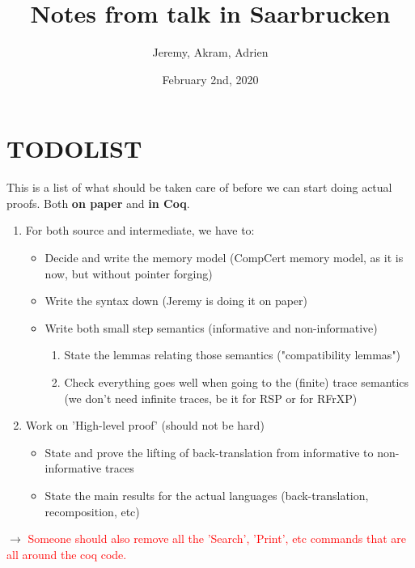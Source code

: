 \documentclass[12pt,a4paper]{article}
\title{Notes from talk in Saarbrucken}
\author{Jeremy, Akram, Adrien}
\date{February 2nd, 2020}
\newcommand{\todo}[1]{$\rightarrow$ \textcolor{red}{#1}}
\begin{document}
\maketitle
\tableofcontents


\section{TODOLIST}
This is a list of what should be taken care of before we can start doing actual proofs. 
Both \textbf{on paper} and \textbf{in Coq}.

\begin{enumerate}
\item For both source and intermediate, we have to:
\begin{itemize}
\item Decide and write the memory model (CompCert memory model, as it is now, but without pointer forging)
\item Write the syntax down (Jeremy is doing it on paper)
\item Write both small step semantics (informative and non-informative)
\begin{enumerate}[$+$]
\item State the lemmas relating those semantics ("compatibility lemmas")
\item Check everything goes well when going to the (finite) trace semantics\\
(we don't need infinite traces, be it for RSP or for RFrXP)
\end{enumerate}
\end{itemize}
\item Work on 'High-level proof' (should not be hard)
\begin{itemize}
\item State and prove the lifting of back-translation from informative to non-informative traces
\item State the main results for the actual languages (back-translation, recomposition, etc)
\end{itemize}
\end{enumerate}

\todo{Someone should also remove all the 'Search', 'Print', etc commands that 
are all around the coq code.}
\end{document}
